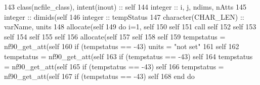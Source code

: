 \begin{DoxyCode}
143     \textcolor{keywordtype}{class}(ncfile\_class), \textcolor{keywordtype}{intent(inout)} :: self
144     \textcolor{keywordtype}{integer} :: i, j, ndims, nAtts
145     \textcolor{keywordtype}{integer} :: dimids(self%
146     \textcolor{keywordtype}{integer} :: tempStatus
147     \textcolor{keywordtype}{character(CHAR\_LEN)} :: varName, units
148     \textcolor{keyword}{allocate}(self%
149     \textcolor{keywordflow}{do} i=1, self%
150         self%
151         \textcolor{keyword}{call }self%
152         self%
153         self%
154         self%
155         self%
156         \textcolor{keyword}{allocate}(self%
157         self%
158         self%
159         tempstatus = nf90\_get\_att(self%
160         \textcolor{keywordflow}{if} (tempstatus == -43) units = \textcolor{stringliteral}{"not set"}
161         self%
162         tempstatus = nf90\_get\_att(self%
163         \textcolor{keywordflow}{if} (tempstatus == -43) self%
164         tempstatus = nf90\_get\_att(self%
165         \textcolor{keywordflow}{if} (tempstatus == -43) self%
166         tempstatus = nf90\_get\_att(self%
167         \textcolor{keywordflow}{if} (tempstatus == -43) self%
168 \textcolor{keywordflow}{    end do}
\end{DoxyCode}
\mbox{\label{namespacenetcdfparser__mod_aba877869db6bea7262d659133253cff7}} 
